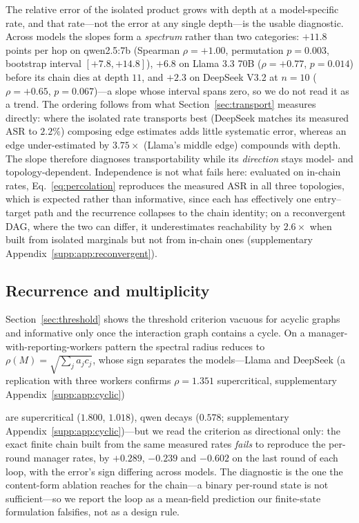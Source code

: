 \documentclass[sigconf,anonymous]{aamas}
\newcommand{\suppref}[1]{supplementary Appendix~\ref{supp:#1}}
\begin{document}
The relative error of the isolated product grows with depth at a model-specific rate,
and that rate---not the error at any single depth---is the usable diagnostic. Across
models the slopes form a \emph{spectrum} rather than two categories: $+11.8$ points per
hop on qwen2.5:7b (Spearman $\rho = +1.00$, permutation $p = 0.003$, bootstrap interval
$[+7.8, +14.8]$), $+6.8$ on Llama 3.3 70B ($\rho = +0.77$, $p = 0.014$) before its
chain dies at depth $11$, and $+2.3$ on DeepSeek V3.2 at $n = 10$ ($\rho = +0.65$,
$p = 0.067$)---a slope whose interval spans zero, so we do not read it as a trend. The
ordering follows from what Section~\ref{sec:transport} measures directly: where the
isolated rate transports best (DeepSeek matches its measured ASR to $2.2\%$) composing
edge estimates adds little systematic error, whereas an edge under-estimated by
$3.75\times$ (Llama's middle edge) compounds with depth. The slope therefore diagnoses
transportability while its \emph{direction} stays model- and topology-dependent.
Independence is not what fails here: evaluated on in-chain rates,
Eq.~\eqref{eq:percolation} reproduces the measured ASR in all three topologies, which
is expected rather than informative, since each has effectively one entry--target path
and the recurrence collapses to the chain identity; on a reconvergent DAG, where the two
can differ, it underestimates reachability by $2.6\times$ when built from isolated
marginals but not from in-chain ones (\suppref{app:reconvergent}).

\subsection{Recurrence and multiplicity}
\label{sec:cyclic}

Section~\ref{sec:threshold} shows the threshold criterion vacuous for acyclic graphs
and informative only once the interaction graph contains a cycle. On a
manager-with-reporting-workers pattern the spectral radius reduces to
$\rho(M) = \sqrt{\sum_j a_j c_j}$, whose sign separates the models---Llama and DeepSeek
(a replication with three workers confirms $\rho = 1.351$ supercritical, \suppref{app:cyclic})

are supercritical ($1.800$, $1.018$), qwen decays ($0.578$; \suppref{app:cyclic})---but
we read the criterion as directional only: the exact finite chain built from the same
measured rates \emph{fails} to reproduce the per-round manager rates, by $+0.289$,
$-0.239$ and $-0.602$ on the last round of each loop, with the error's sign differing
across models. The diagnostic is the one the content-form ablation reaches for the
chain---a binary per-round state is not sufficient---so we report the loop as a
mean-field prediction our finite-state formulation falsifies, not as a design rule.
\end{document}
